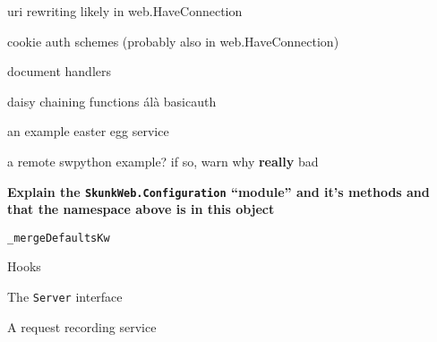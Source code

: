 \documentclass{manual}
\begin{document}
uri rewriting likely in web.HaveConnection

cookie auth schemes (probably also in web.HaveConnection)

document handlers

daisy chaining functions \'al\`a basicauth


an example easter egg service

a remote swpython example?  if so, warn why \textbf{really} bad

\textbf{Explain the \texttt{SkunkWeb.Configuration} ``module'' and
it's methods and that the namespace above is in this object}

\verb!_mergeDefaultsKw!

Hooks

The \verb!Server! interface

A request recording service


\appendix



\cleardoublepage

\printindex
\end{document}
